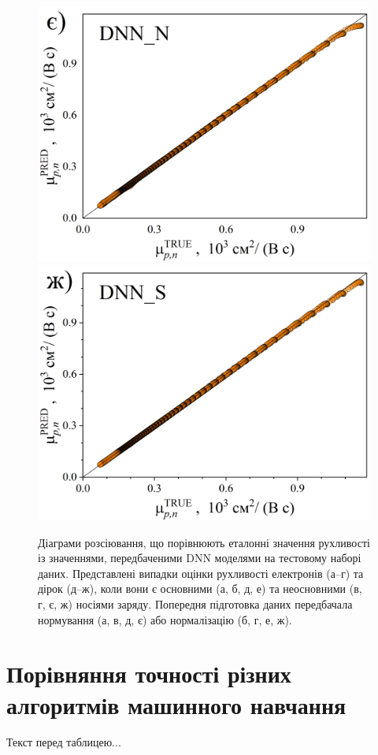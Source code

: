 \documentclass[12pt,a4paper,titlepage,oneside]{book}
\numberwithin{equation}{part}
\begin{document}
\begin{figure}
     \includegraphics[width=0.35\linewidth]{DNNNpn.png}\kern 20pt
     \includegraphics[width=0.35\linewidth]{DNNSpn.png}
	  \caption{Діаграми розсіювання, що порівнюють еталонні значення рухливості із значеннями, передбаченими DNN моделями 
       на тестовому наборі даних.
       Представлені випадки оцінки рухливості електронів (а--г) та дірок (д--ж), коли вони є
       основними (а, б, д, е) та неосновними (в, г, є, ж) носіями заряду.
       Попередня підготовка даних передбачала нормування (а, в, д, є) або нормалізацію (б, г, е, ж).
}\label{figDNN}
\end{figure}



\section{Порівняння точності різних алгоритмів машинного навчання}


Текст перед таблицею...
\end{document}
